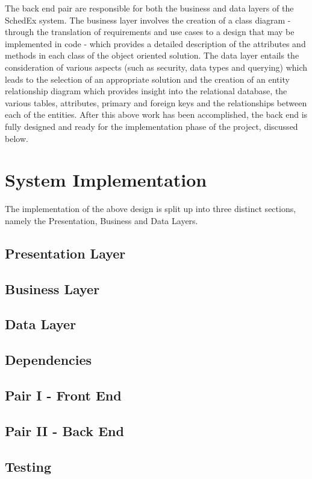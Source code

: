 \documentclass{article}
\begin{document}
The back end pair are responsible for both the business and data layers of the SchedEx system. The business layer involves the creation of a class diagram - through the translation of requirements and use cases to a design that may be implemented in code - which provides a detailed description of the attributes and methods in each class of the object oriented solution. The data layer entails the consideration of various aspects (such as security, data types and querying) which leads to the selection of an appropriate solution and the creation of an entity relationship diagram which provides insight into the relational database, the various tables, attributes, primary and foreign keys and the relationships between each of the entities. After this above work has been accomplished, the back end is fully designed and ready for the implementation phase of the project, discussed below.

\section{System Implementation}
The implementation of the above design is split up into three distinct sections, namely the Presentation,
Business and Data Layers.

\subsection{Presentation Layer}
\subsection{Business Layer}
\subsection{Data Layer}
\subsection{Dependencies}

\subsection{Pair I - Front End}

\subsection{Pair II - Back End}

\subsection{Testing}
\end{document}
